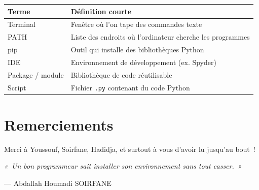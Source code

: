 \documentclass[12pt,a4paper]{article}
\begin{document}
	\begin{center}
		\begin{tabular}{|l|p{9.5cm}|}
			\hline
			\textbf{Terme} & \textbf{Définition courte} \\
			\hline
			Terminal & Fenêtre où l'on tape des commandes texte \\
			PATH & Liste des endroits où l'ordinateur cherche les programmes \\
			pip & Outil qui installe des bibliothèques Python \\
			IDE & Environnement de développement (ex. Spyder) \\
			Package / module & Bibliothèque de code réutilisable \\
			Script & Fichier \texttt{.py} contenant du code Python \\
			\hline
		\end{tabular}
	\end{center}
	
	
	\section*{Remerciements}
	
	Merci à Youssouf, Soirfane, Hadidja, et surtout à vous d'avoir lu jusqu'au bout~!
	
	\begin{center}
		\textit{«~Un bon programmeur sait installer son environnement sans tout casser.~»}
		
		\smallskip
		--- Abdallah Houmadi SOIRFANE
	\end{center}
	
\end{document}
